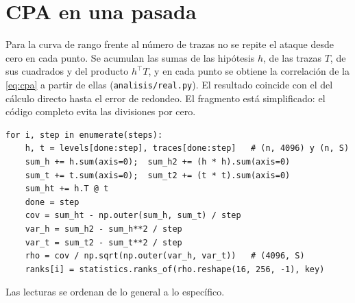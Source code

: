 \section{CPA en una pasada}

Para la curva de rango frente al número de trazas no se repite el ataque desde
cero en cada punto. Se acumulan las sumas de las hipótesis $h$, de las trazas
$T$, de sus cuadrados y del producto $h^\top T$, y en cada punto se obtiene la
correlación de la \cref{eq:cpa} a partir de ellas (\texttt{analisis/real.py}).
El resultado coincide con el del cálculo directo hasta el error de redondeo.
El fragmento está simplificado: el código completo evita las divisiones por
cero.

\begin{lstlisting}[style=python]
for i, step in enumerate(steps):
    h, t = levels[done:step], traces[done:step]   # (n, 4096) y (n, S)
    sum_h += h.sum(axis=0);  sum_h2 += (h * h).sum(axis=0)
    sum_t += t.sum(axis=0);  sum_t2 += (t * t).sum(axis=0)
    sum_ht += h.T @ t
    done = step
    cov = sum_ht - np.outer(sum_h, sum_t) / step
    var_h = sum_h2 - sum_h**2 / step
    var_t = sum_t2 - sum_t**2 / step
    rho = cov / np.sqrt(np.outer(var_h, var_t))   # (4096, S)
    ranks[i] = statistics.ranks_of(rho.reshape(16, 256, -1), key)
\end{lstlisting}

\clearpage
{}
\label{anx:bibliografia}

Las lecturas se ordenan de lo general a lo específico.

